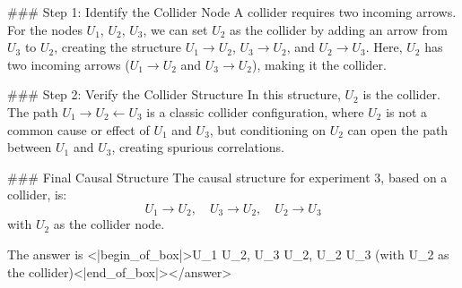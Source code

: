 ### Step 1: Identify the Collider Node  
A collider requires two incoming arrows. For the nodes \(U_1\), \(U_2\), \(U_3\), we can set \(U_2\) as the collider by adding an arrow from \(U_3\) to \(U_2\), creating the structure \(U_1 \to U_2\), \(U_3 \to U_2\), and \(U_2 \to U_3\). Here, \(U_2\) has two incoming arrows (\(U_1 \to U_2\) and \(U_3 \to U_2\)), making it the collider.  


### Step 2: Verify the Collider Structure  
In this structure, \(U_2\) is the collider. The path \(U_1 \to U_2 \leftarrow U_3\) is a classic collider configuration, where \(U_2\) is not a common cause or effect of \(U_1\) and \(U_3\), but conditioning on \(U_2\) can open the path between \(U_1\) and \(U_3\), creating spurious correlations.  


### Final Causal Structure  
The causal structure for experiment 3, based on a collider, is:  
\[
U_1 \to U_2, \quad U_3 \to U_2, \quad U_2 \to U_3
\]  
with \(U_2\) as the collider node.  

The answer is <|begin_of_box|>U_1 \to U_2, U_3 \to U_2, U_2 \to U_3 (with U_2 as the collider)<|end_of_box|></answer>